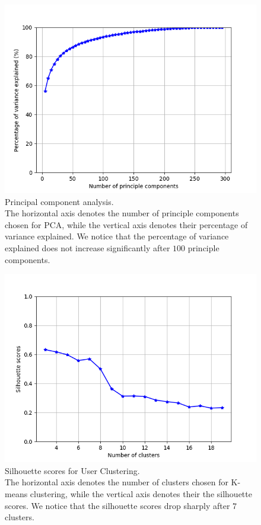 \documentclass{bmcart}
\begin{document}
\begin{backmatter}
\begin{figure}[h!]
    \label{fig:CNNEncoders}
\end{figure}
\pagebreak
\begin{figure}[h!]
    \centering
    \captionsetup{justification=centering}
    \includegraphics[scale=0.6]{pca.png}
    \caption{Principal component analysis. \\ The horizontal axis denotes the number of principle components chosen for PCA, while the vertical axis denotes their percentage of variance explained. We notice that the percentage of variance explained does not increase significantly after $100$ principle components.}
    \label{fig:PCA}
\end{figure}
\begin{figure}[h!]
    \centering
    \captionsetup{justification=centering}
    \includegraphics[scale=0.6]{k_means.png}
    \caption{Silhouette scores for User Clustering. \\ The horizontal axis denotes the number of clusters chosen for K-means clustering, while the vertical axis denotes their the silhouette scores. We notice that the silhouette scores drop sharply after $7$ clusters.}
    \label{fig:KMeans}
\end{figure}


\end{backmatter}
\end{document}
